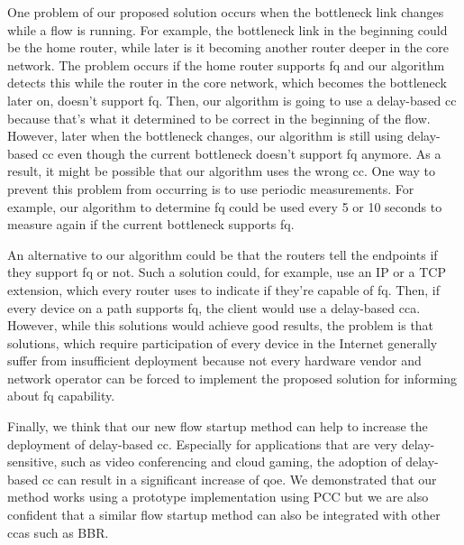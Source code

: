 \documentclass[runningheads]{llncs}
\begin{document}
One problem of our proposed solution occurs when the bottleneck link changes while a flow is running. For example, the bottleneck link in the beginning could be the home router, while later is it becoming another router deeper in the core network. The problem occurs if the home router supports \gls{fq} and our algorithm detects this while the router in the core network, which becomes the bottleneck later on, doesn't support \gls{fq}. Then, our algorithm is going to use a delay-based \gls{cc} because that's what it determined to be correct in the beginning of the flow. However, later when the bottleneck changes, our algorithm is still using delay-based \gls{cc} even though the current bottleneck doesn't support \gls{fq} anymore. As a result, it might be possible that our algorithm uses the wrong \gls{cc}. One way to prevent this problem from occurring is to use periodic measurements. For example, our algorithm to determine \gls{fq} could be used every 5 or 10 seconds to measure again if the current bottleneck supports \gls{fq}. 

An alternative to our algorithm could be that the routers tell the endpoints if they support \gls{fq} or not. Such a solution could, for example, use an IP or a TCP extension, which every router uses to indicate if they're capable of \gls{fq}. Then, if every device on a path supports \gls{fq}, the client would use a delay-based \gls{cca}. However, while this solutions would achieve good results, the problem is that solutions, which require participation of every device in the Internet generally suffer from insufficient deployment because not every hardware vendor and network operator can be forced to implement the proposed solution for informing about \gls{fq} capability. 

Finally, we think that our new flow startup method can help to increase the deployment of delay-based \gls{cc}. Especially for applications that are very delay-sensitive, such as video conferencing and cloud gaming, the adoption of delay-based \gls{cc} can result in a significant increase of \gls{qoe}. We demonstrated that our method works using a prototype implementation using PCC but we are also confident that a similar flow startup method can also be integrated with other \glspl{cca} such as BBR. 



\end{document}
